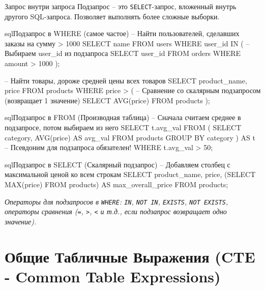 \begin{myblock}{Запрос внутри запроса}
    Подзапрос – это \texttt{SELECT}-запрос, вложенный внутрь другого SQL-запроса. Позволяет выполнять более сложные выборки.
    \begin{codebox}{sql}{Подзапрос в WHERE (самое частое)}
    -- Найти пользователей, сделавших заказы на сумму > 1000
    SELECT name
    FROM users
    WHERE user_id IN ( -- Выбираем user_id из подзапроса
        SELECT user_id
        FROM orders
        WHERE amount > 1000
    );

    -- Найти товары, дороже средней цены всех товаров
    SELECT product_name, price
    FROM products
    WHERE price > ( -- Сравнение со скалярным подзапросом (возвращает 1 значение)
        SELECT AVG(price) FROM products
    );
    \end{codebox}
    \begin{codebox}{sql}{Подзапрос в FROM (Производная таблица)}
    -- Сначала считаем среднее в подзапросе, потом выбираем из него
    SELECT t.avg_val
    FROM (
        SELECT category, AVG(price) AS avg_val
        FROM products
        GROUP BY category
    ) AS t -- Псевдоним для подзапроса обязателен!
    WHERE t.avg_val > 50;
    \end{codebox}
    \begin{codebox}{sql}{Подзапрос в SELECT (Скалярный подзапрос)}
    -- Добавляем столбец с максимальной ценой ко всем строкам
    SELECT
        product_name,
        price,
        (SELECT MAX(price) FROM products) AS max_overall_price
    FROM products;
    \end{codebox}
    \textit{Операторы для подзапросов в \texttt{WHERE}: \texttt{IN}, \texttt{NOT IN}, \texttt{EXISTS}, \texttt{NOT EXISTS}, операторы сравнения (\texttt{=}, \texttt{>}, \texttt{<} и т.д., если подзапрос возвращает одно значение).}
\end{myblock}

\section{Общие Табличные Выражения (CTE - Common Table Expressions)}

